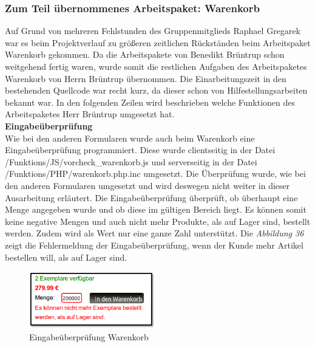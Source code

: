 \subsubsection{Zum Teil übernommenes Arbeitspaket: Warenkorb}
Auf Grund von mehreren Fehlstunden des Gruppenmitglieds Raphael Gregarek war es beim Projektverlauf zu größeren zeitlichen Rückständen beim Arbeitspaket \glqq Warenkorb\grqq{} gekommen. Da die Arbeitspakete von Benedikt Brüntrup schon weitgehend fertig waren, wurde somit die restlichen Aufgaben des Arbeitspaketes \glqq Warenkorb\grqq{} von Herrn Brüntrup übernommen. Die Einarbeitungszeit in den bestehenden Quellcode war recht kurz, da dieser schon von Hilfestellungsarbeiten bekannt war. In den folgenden Zeilen wird beschrieben welche Funktionen des Arbeitspaketes Herr Brüntrup umgesetzt hat.\\

\textbf{Eingabeüberprüfung}\\
Wie bei den anderen Formularen wurde auch beim Warenkorb eine Eingabeüberprüfung programmiert. Diese wurde clientseitig in der Datei \glqq /Funktions/JS/vorcheck\_warenkorb.js\grqq{} und serverseitig in der Datei \glqq /Funktions/PHP/warenkorb.php.inc\grqq{} umgesetzt. Die Überprüfung wurde, wie bei den anderen Formularen umgesetzt und wird deswegen nicht weiter in dieser Ausarbeitung erläutert. Die Eingabeüberprüfung überprüft, ob überhaupt eine Menge angegeben wurde und ob diese im gültigen Bereich liegt. Es können somit keine negative Mengen und auch nicht mehr Produkte, als auf Lager sind, bestellt werden. Zudem wird als Wert nur eine ganze Zahl unterstützt. Die \textit{Abbildung 36} zeigt die Fehlermeldung der Eingabeüberprüfung, wenn der Kunde mehr Artikel bestellen will, als auf Lager sind.\\

\begin{figure}[H]
	\begin{center}
			\includegraphics[width=55mm]{Bilder/warenkorb_eingabepruefung.png}
	\end{center}
	\caption{Eingabeüberprüfung Warenkorb}
\end{figure}

